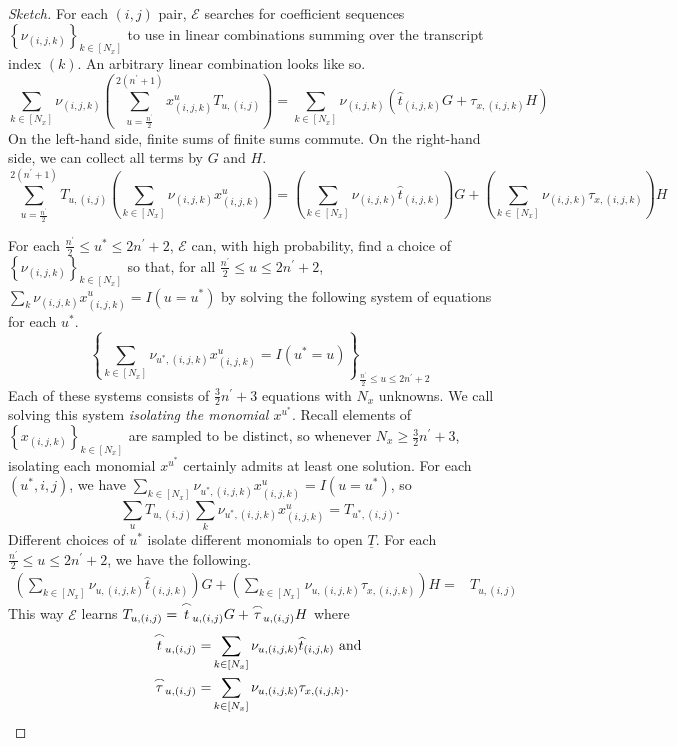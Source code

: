 \documentclass{article}
\theoremstyle{definition}
\begin{document}
\begin{proof}[Sketch]
For each $(i,j)$ pair, $\mathcal{E}$ searches for coefficient sequences $\left\{\nu_{(i,j,k)}\right\}_{k \in [N_x]}$ to use in linear combinations summing over the transcript index $(k)$. An arbitrary linear combination looks like so.
$$\sum_{k \in [N_x]} \nu_{(i,j,k)} \left(\sum_{u=\frac{n^\prime}{2}}^{2(n^\prime+1)} x^u_{(i,j,k)} T_{u, (i,j)}\right) = \sum_{k \in [N_x]} \nu_{(i,j,k)}\left(\widehat{t}_{(i,j,k)}G + \tau_{x,(i,j,k)}H\right)$$
On the left-hand side, finite sums of finite sums commute. On the right-hand side, we can collect all terms by $G$ and $H$.
$$\sum_{u=\frac{n^\prime}{2}}^{2(n^\prime\!+\!1)}\!T_{u, (i,j)}\!\left(\!\sum_{k\!\in\![N_x]}\!\nu_{\!(\!i\!,j\!,k\!)}\!x^u_{\!(\!i\!,j\!,k\!)}\!\!\right)\!=\!\left(\!\sum_{k\!\in\![N_x]}\!\nu_{\!(\!i\!,j\!,k\!)}\widehat{t}_{\!(\!i\!,j\!,k)}\!\right)\!G\!+\!\left(\!\sum_{k\!\in\![\!N_x\!]}\nu_{\!(\!i\!,j\!,k)}\tau_{x\!,(\!i\!,j\!,k)}\!\right)\!H$$

For each $\frac{n^\prime}{2} \leq u^* \leq 2n^\prime+2$, $\mathcal{E}$ can, with high probability, find a choice of $\left\{\nu_{(i,j,k)}\right\}_{k \in [N_x]}$ so that, for all $\frac{n^\prime}{2} \leq u \leq 2n^\prime + 2$, $\sum_k \nu_{(i,j,k)} x^u_{(i,j,k)} = I(u=u^*)$ by solving  the following system of equations for each $u^*$.
\[\left\{\sum_{k \in [N_x]} \nu_{u^*,(i,j,k)} x_{(i,j,k)}^u = I(u^* = u)\right\}_{\frac{n^\prime}{2} \leq u \leq 2n^\prime+2}\]
Each of these systems consists of $\frac{3}{2}n^\prime + 3$ equations with $N_x$ unknowns. We call solving this system \textit{isolating the monomial $x^{u^*}$}.
Recall elements of $\left\{x_{(i,j,k)}\right\}_{k \in [N_x]}$ are sampled to be distinct, so whenever $N_x \geq \frac{3}{2}n^\prime + 3$, isolating each monomial $x^{u^*}$ certainly admits at least one solution.
For each $(u^*,i,j)$, we have $\sum_{k \in [N_x]} \nu_{u^*,(i,j,k)} x_{(i,j,k)}^u = I(u=u^*)$, so $$\sum_u T_{u, (i,j)} \sum_k \nu_{u^*,(i,j,k)} x^u_{(i,j,k)} = T_{u^*,(i,j)}.$$ Different choices of $u^*$  isolate different monomials to open $\underline{T}$. For each $\frac{n^\prime}{2} \leq u \leq 2n^\prime+2$, we have the following.
\begin{align*}
\left(\sum_{k \in [N_x]} \nu_{u,(i,j,k)}\widehat{t}_{(i,j,k)}\right)G + \left(\sum_{k \in [N_x]} \nu_{u,(i,j,k)}\tau_{x,(i,j,k)}\right)H =& 
 T_{u, (i,j)}
\end{align*}
This way $\mathcal{E}$  learns 
$T_{u, (i,j)} = \overset{\LARGE \frown}{\small{t}}_{u,(i,j)}G + \overset{\LARGE \frown}{\small{\tau}}_{u,(i,j)}H$  where
\begin{align}
\overset{\LARGE \frown}{\small{t}}_{u, (i,j)} =& \sum_{k \in [N_x]} \nu_{u,(i,j,k)}\widehat{t}_{(i,j,k)}\text{ and } \label{extracted_t}\\
\overset{\LARGE \frown}{\small{\tau}}_{u, (i,j)} =& \sum_{k \in [N_x]} \nu_{u,(i,j,k)} \tau_{x,(i,j,k)}. \label{extracted_tau}
\end{align} 


\end{proof}
\end{document}
